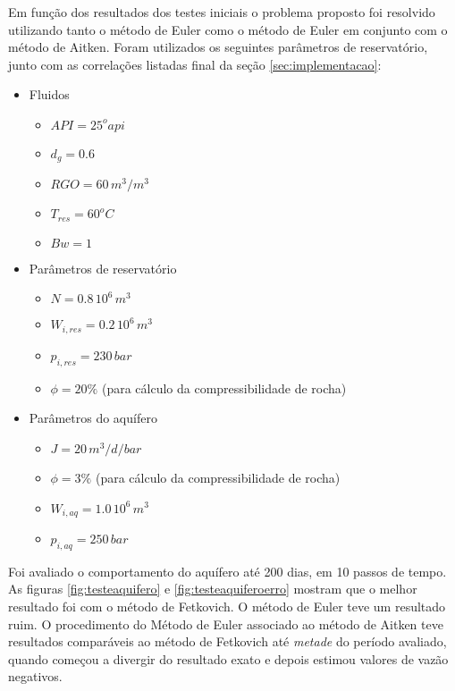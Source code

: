 \documentclass[final,5p]{elsarticle}
\numberwithin{equation}{section}
\begin{document}
        Em função dos resultados dos testes iniciais o problema proposto foi resolvido utilizando tanto o método de Euler como o método de Euler em conjunto com o método de Aitken. Foram utilizados os seguintes parâmetros de reservatório, junto com as correlações listadas final da seção \ref{sec:implementacao}:

        \begin{itemize}
            \item Fluidos
            \begin{itemize}
                \item $API = 25^oapi$
                \item $d_g = 0.6$
                \item $RGO = 60 \, m^3/m^3$
                \item $T_{res} = 60^oC$
                \item $Bw = 1$
            \end{itemize}
            \item Parâmetros de reservatório
            \begin{itemize}
                \item $N = 0.8 \, 10^6 \, m^3$
                \item $W_{i,res} = 0.2 \, 10^6 \, m^3$
                \item $p_{i,res} = 230 \, bar$
                \item $\phi = 20\%$ (para cálculo da compressibilidade de rocha)
            \end{itemize}
            \item Parâmetros do aquífero
            \begin{itemize}
                \item $J = 20 \, m^3/d/bar$
                \item $\phi = 3\%$ (para cálculo da compressibilidade de rocha)
                \item $W_{i,aq} = 1.0 \, 10^6 \, m^3$
                \item $p_{i,aq} = 250 \, bar$
            \end{itemize}
        \end{itemize}

        Foi avaliado o comportamento do aquífero até 200 dias, em 10 passos de tempo. As figuras \ref{fig:testeaquifero} e \ref{fig:testeaquiferoerro} mostram que o melhor resultado foi com o método de Fetkovich. O método de Euler teve um resultado ruim. O procedimento do Método de Euler associado ao método de Aitken teve resultados comparáveis ao método de Fetkovich até \emph{metade} do período avaliado, quando começou a divergir do resultado exato e depois estimou valores de vazão negativos.
\end{document}
